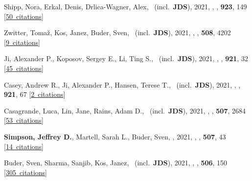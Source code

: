\item[{\color{numcolor}\scriptsize67}] Shipp, Nora, Erkal, Denis, Drlica-Wagner, Alex, \etal\ (incl.\ \textbf{JDS}), 2021, , \apj, \textbf{923}, 149 [\href{https://ui.adsabs.harvard.edu/#abs/2021ApJ...923..149S}{50~citations}]

\item[{\color{numcolor}\scriptsize66}] Zwitter, Toma{\v{z}}, Kos, Janez, Buder, Sven, \etal\ (incl.\ \textbf{JDS}), 2021, , \mnras, \textbf{508}, 4202 [\href{https://ui.adsabs.harvard.edu/#abs/2021MNRAS.508.4202Z}{9~citations}]

\item[{\color{numcolor}\scriptsize65}] Ji, Alexander P., Koposov, Sergey E., Li, Ting S., \etal\ (incl.\ \textbf{JDS}), 2021, , \apj, \textbf{921}, 32 [\href{https://ui.adsabs.harvard.edu/#abs/2021ApJ...921...32J}{45~citations}]

\item[{\color{numcolor}\scriptsize64}] Casey, Andrew R., Ji, Alexander P., Hansen, Terese T., \etal\ (incl.\ \textbf{JDS}), 2021, , \apj, \textbf{921}, 67 [\href{https://ui.adsabs.harvard.edu/#abs/2021ApJ...921...67C}{2~citations}]

\item[{\color{numcolor}\scriptsize63}] Casagrande, Luca, Lin, Jane, Rains, Adam D., \etal\ (incl.\ \textbf{JDS}), 2021, , \mnras, \textbf{507}, 2684 [\href{https://ui.adsabs.harvard.edu/#abs/2021MNRAS.507.2684C}{53~citations}]

\item[{\color{numcolor}\scriptsize62}] \textbf{Simpson, Jeffrey D.}, Martell, Sarah L., Buder, Sven, \etal, 2021, , \mnras, \textbf{507}, 43 [\href{https://ui.adsabs.harvard.edu/#abs/2021MNRAS.507...43S}{14~citations}]

\item[{\color{numcolor}\scriptsize61}] Buder, Sven, Sharma, Sanjib, Kos, Janez, \etal\ (incl.\ \textbf{JDS}), 2021, , \mnras, \textbf{506}, 150 [\href{https://ui.adsabs.harvard.edu/#abs/2021MNRAS.506..150B}{305~citations}]

